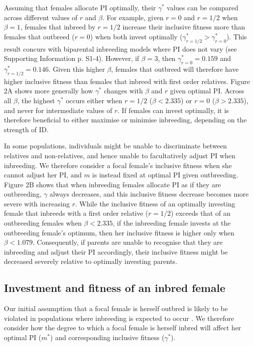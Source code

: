 \documentclass[12pt]{article}
\begin{document}
Assuming that females allocate PI optimally, their $\gamma^{*}$ values can be compared across different values of $r$ and $\beta$. For example, given $r=0$ and $r=1/2$ when $\beta=1$, females that inbreed by $r=1/2$ increase their inclusive fitness more than females that outbreed ($r=0$) when both invest optimally ($\gamma^{*}_{r=1/2}>\gamma^{*}_{r=0}$). This result concurs with biparental inbreeding models where PI does not vary (see Supporting Information p. S1-4). However, if $\beta=3$, then $\gamma^{*}_{r=0}=0.159$ and $\gamma^{*}_{r=1/2}=0.146$. Given this higher $\beta$, females that outbreed will therefore have higher inclusive fitness than females that inbreed with first order relatives. Figure 2A shows more generally how $\gamma^{*}$ changes with $\beta$ and $r$ given optimal PI. Across all $\beta$, the highest $\gamma^{*}$ occurs either when $r=1/2$ ($\beta < 2.335$) or $r=0$ ($\beta > 2.335$), and never for intermediate values of $r$. If females can invest optimally, it is therefore beneficial to either maximise or minimise inbreeding, depending on the strength of ID.

In some populations, individuals might be unable to discriminate between relatives and non-relatives, and hence unable to facultatively adjust PI when inbreeding. We therefore consider a focal female's inclusive fitness when she cannot adjust her PI, and $m$ is instead fixed at optimal PI given outbreeding. Figure 2B shows that when inbreeding females allocate PI as if they are outbreeding, $\gamma$ always decreases, and this inclusive fitness decrease becomes more severe with increasing $r$. While the inclusive fitness of an optimally investing female that inbreeds with a first order relative ($r=1/2$) exceeds that of an outbreeding females when $\beta < 2.335$, if the inbreeding female invests at the outbreeding female's optimum, then her inclusive fitness is higher only when $\beta < 1.079$. Consequently, if parents are unable to recognise that they are inbreeding and adjust their PI accordingly, their inclusive fitness might be decreased severely relative to optimally investing parents.


\subsection*{Investment and fitness of an inbred female}

Our initial assumption that a focal female is herself outbred is likely to be violated in populations where inbreeding is expected to occur \cite[][]{Duthie2015a}. We therefore consider how the degree to which a focal female is herself inbred will affect her optimal PI ($m^{*}$) and corresponding inclusive fitness ($\gamma^{*}$).
\end{document}
